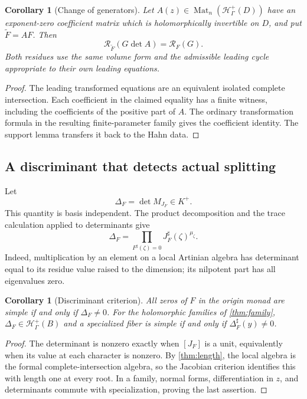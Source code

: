 \documentclass[11pt,letterpaper]{article}
\newtheorem{corollary}[theorem]{Corollary}
\theoremstyle{definition}
\theoremstyle{remark}
\newcommand{\HH}{\mathcal H}
\newcommand{\sh}{^{\sharp}}
\newcommand{\Kp}{K^{+}}
\newcommand{\Hp}{\HH^{+}_{\Gamma}}
\newcommand{\RR}{\mathcal R}
\begin{document}
\begin{corollary}[Change of generators]\label{cor:transformation}
Let $A(z)\in\operatorname{Mat}_n(\Hp(D))$ have an exponent-zero coefficient matrix which is holomorphically invertible on $D$, and put $\widetilde F=AF$. Then
\[
 \RR_{\widetilde F}(G\det A)=\RR_F(G).
\]
Both residues use the same volume form and the admissible leading cycle appropriate to their own leading equations.
\end{corollary}
\begin{proof}
The leading transformed equations are an equivalent isolated complete intersection. Each coefficient in the claimed equality has a finite witness, including the coefficients of the positive part of $A$. The ordinary transformation formula \cite[\S I(a)]{GriffithsHarris} in the resulting finite-parameter family gives the coefficient identity. The support lemma transfers it back to the Hahn data.
\end{proof}

\subsection{A discriminant that detects actual splitting}
Let
\begin{equation}\label{eq:discriminant}
 \Delta_F=\det M_{J_F}\in\Kp.
\end{equation}
This quantity is basis independent. The product decomposition and the trace calculation applied to determinants give
\[
 \Delta_F=\prod_{F\sh(\zeta)=0}J_F\sh(\zeta)^{\mu_\zeta}.
\]
Indeed, multiplication by an element on a local Artinian algebra has determinant equal to its residue value raised to the dimension; its nilpotent part has all eigenvalues zero.

\begin{corollary}[Discriminant criterion]\label{cor:discriminant}
All zeros of $F$ in the origin monad are simple if and only if $\Delta_F\ne0$. For the holomorphic families of \cref{thm:family}, $\Delta_F\in\Hp(B)$ and a specialized fiber is simple if and only if $\Delta_F\sh(y)\ne0$.
\end{corollary}
\begin{proof}
The determinant is nonzero exactly when $[J_F]$ is a unit, equivalently when its value at each character is nonzero. By \cref{thm:length}, the local algebra is the formal complete-intersection algebra, so the Jacobian criterion identifies this with length one at every root. In a family, normal forms, differentiation in $z$, and determinants commute with specialization, proving the last assertion.
\end{proof}
\end{document}
